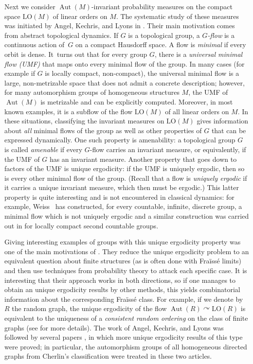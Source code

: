 \documentclass[11pt]{article}
\let\actson\curvearrowright
\theoremstyle{plain}
\theoremstyle{definition}
\DeclareMathOperator{\Aut}{Aut}
\newcommand{\LO}{\mathrm{LO}}
\begin{document}
Next we consider $\Aut(M)$-invariant probability measures on the compact space $\LO(M)$ of linear orders on $M$. The systematic study of these measures was initiated by Angel, Kechris, and Lyons in \cite{Angel2014}. Their main motivation comes from abstract topological dynamics. If $G$ is a topological group, a \emph{$G$-flow} is a continuous action of~$G$ on a compact Hausdorff space. A flow is \emph{minimal} if every orbit is dense. It~turns out that for every group $G$, there is a \emph{universal minimal flow (UMF)} that maps onto every minimal flow of the group. In many cases (for example if $G$ is locally compact, non-compact), the universal minimal flow is a large, non-metrizable space that does not admit a concrete description; however, for many automorphism groups of homogeneous structures $M$, the UMF of $\Aut(M)$ is metrizable and can be explicitly computed. Moreover, in most known examples, it is a subflow of the flow $\LO(M)$ of all linear orders on $M$. In these situations, classifying the invariant measures on $\LO(M)$ gives information about \emph{all} minimal flows of the group as well as other properties of $G$ that can be expressed dynamically. One such property is amenability: a topological group $G$ is called \emph{amenable} if every $G$-flow carries an invariant measure, or equivalently, if the UMF of $G$ has an invariant measure. Another property that goes down to factors of the UMF is unique ergodicity: if the UMF is uniquely ergodic, then so is every other minimal flow of the group. (Recall that a flow is \emph{uniquely ergodic} if it carries a unique invariant measure, which then must be ergodic.) This latter property is quite interesting and is not encountered in classical dynamics: for example, Weiss~\cite{Weiss2012} has constructed, for every countable, infinite, discrete group, a minimal flow which is not uniquely ergodic and a similar construction was carried out in \cite{Jahel2020p} for locally compact second countable groups.

Giving interesting examples of groups with this unique ergodicity property was one of the main motivations of \cite{Angel2014}. They reduce the unique ergodicity problem to an equivalent question about finite structures (as is often done with Fraïssé limits) and then use techniques from probability theory to attack each specific case. It is interesting that their approach works in both directions, so if one manages to obtain an unique ergodicity results by other methods, this yields combinatorial information about the corresponding Fraïssé class. For example, if we denote by $R$ the random graph, the unique ergodicity of the flow $\Aut(R) \actson \LO(R)$ is equivalent to the uniqueness of a \emph{consistent random ordering} on the class of finite graphs (see \cite{Angel2014} for more details). The work of Angel, Kechris, and Lyons was followed by several papers \cite{Pawliuk2020, Jahel2019p}, in which more unique ergodicity results of this type were proved; in particular, the automorphism groups of all homogeneous directed graphs from Cherlin's classification were treated in these two articles.
\end{document}
